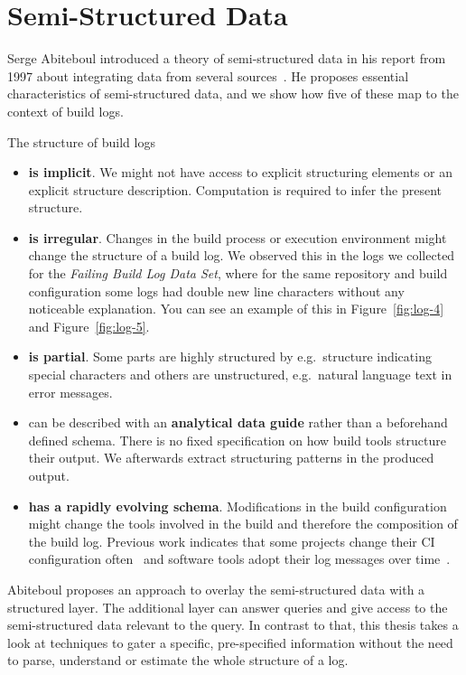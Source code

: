 \documentclass[\myrootdir/main.tex]{subfiles}
\begin{document}

\section{Semi-Structured Data}
\label{sec:rw-semi-structured-data}
Serge Abiteboul introduced a theory of semi-structured data in his report from 1997 about integrating data from several sources~\cite{abiteboul1997querying}.
He proposes essential characteristics of semi-structured data, and we show how five of these map to the context of build logs.

The structure of build logs
\begin{itemize}
  \item \textbf{is implicit}.
  We might not have access to explicit structuring elements or an explicit structure description.
  Computation is required to infer the present structure.
  \item \textbf{is irregular}.
  Changes in the build process or execution environment might change the structure of a build log.
  We observed this in the logs we collected for the \emph{Failing Build Log Data Set}, where for the same repository and build configuration some logs had double new line characters without any noticeable explanation.
  You can see an example of this in Figure~\ref{fig:log-4} and Figure~\ref{fig:log-5}.
  \item \textbf{is partial}. Some parts are highly structured by e.g.\ structure indicating special characters and others are unstructured, e.g.\ natural language text in error messages.
  \item can be described with an \textbf{analytical data guide} rather than a beforehand defined schema.
  There is no fixed specification on how build tools structure their output.
  We afterwards extract structuring patterns in the produced output.
  \item \textbf{has a rapidly evolving schema}.
  Modifications in the build configuration might change the tools involved in the build and therefore the composition of the build log.
  Previous work indicates that some projects change their CI configuration often~\cite{hilton2016usage} and software tools adopt their log messages over time~\cite{yuan2012characterizing}.
\end{itemize}

Abiteboul proposes an approach to overlay the semi-structured data with a structured layer.
The additional layer can answer queries and give access to the semi-structured data relevant to the query.
In contrast to that, this thesis takes a look at techniques to gater a specific, pre-specified information without the need to parse, understand or estimate the whole structure of a log.
\end{document}
